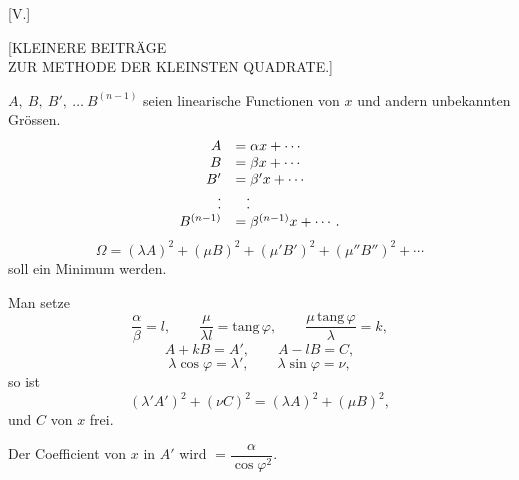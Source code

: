 \clearpage
{}
\begin{center}
[V.]

{\large [KLEINERE BEITRÄGE\\
ZUR METHODE DER KLEINSTEN QUADRATE.]}
\end{center}



$A,\ B,\ B',\ \ldots\ B^{(n-1)}$ seien linearische Functionen von $x$ und
andern unbekannten Grössen.
\[
\begin{array}{rl}
A&=\alpha x+\cdots\\
B&=\beta x+\cdots\\
B'&=\beta' x+\cdots\\
.&\hphantom{=} .\\[-.6em]
.&\hphantom{=} .\\
B^{(n-1)}&=\beta^{(n-1)}x+\cdots.
\end{array}
\]
\[
\Omega = (\lambda A)^2+(\mu B)^2+(\mu' B')^2+(\mu'' B'')^2+\cdots
\]
soll ein Minimum werden.

Man setze
\[
\frac{\alpha}{\beta}=l,\qquad \frac{\mu}{\lambda l}=\mathrm{tang}\,\varphi,\qquad
\frac{\mu\,\mathrm{tang}\,\varphi}{\lambda}=k,
\]
\[
A+kB=A',\qquad A-lB=C,
\]
\[
\lambda\cos\varphi=\lambda',\qquad \lambda\sin\varphi=\nu,
\]
so ist
\[
(\lambda' A')^2+(\nu C)^2=(\lambda A)^2+(\mu B)^2,
\]
und $C$ von $x$ frei.

Der Coefficient von $x$ in $A'$ wird $=\dfrac{\alpha}{\cos\varphi^2}$.

